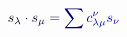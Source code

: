 \documentclass[12pt]{article}
\begin{document}
\makeatletter
\renewcommand*{\@textcolor}[3]{%
  \protect\leavevmode
  \begingroup
    \color#1{#2}#3%
  \endgroup
}
\makeatother
\begin{displaymath}
\mathcolor[RGB]{0,0,15}{s} _ { \mathcolor[RGB]{0,0,30}{\lambda} } \mathcolor[RGB]{0,0,45}{\cdot} \mathcolor[RGB]{0,0,60}{s} _ { \mathcolor[RGB]{0,0,75}{\mu} } \mathcolor[RGB]{0,0,90}{=} \mathcolor[RGB]{0,0,105}{\sum} \mathcolor[RGB]{0,0,120}{c} _ { \mathcolor[RGB]{0,0,135}{\lambda} \mathcolor[RGB]{0,0,150}{\mu} } ^ { \mathcolor[RGB]{0,0,165}{\nu} } \mathcolor[RGB]{0,0,180}{s} _ { \mathcolor[RGB]{0,0,195}{\nu} }
\end{displaymath}
\end{document}
